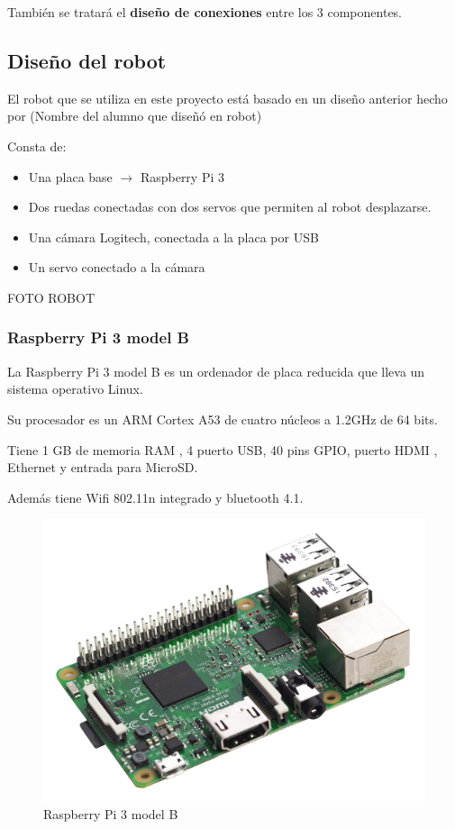\documentclass[twoside, 12pt]{epstfg}
\begin{document}
También se tratará el \textbf{diseño de conexiones} entre los 3 componentes.

\subsection{Diseño del robot}

El robot que se utiliza en este proyecto está basado en un diseño anterior hecho por (Nombre del alumno que diseñó en robot)

Consta de:
\begin{itemize}
	\item Una placa base $\rightarrow$ Raspberry Pi 3
	\item Dos ruedas conectadas con dos servos que permiten al robot desplazarse.
	\item Una cámara Logitech, conectada a la placa por USB
	\item Un servo conectado a la cámara 
\end{itemize}


FOTO ROBOT

\subsubsection{Raspberry Pi 3 model B}

La Raspberry Pi 3 model B es un ordenador de placa reducida que lleva un sistema operativo Linux.

Su procesador es un ARM Cortex A53 de cuatro núcleos a 1.2GHz de 64 bits.

Tiene 1 GB de memoria RAM , 4 puerto USB, 40 pins GPIO, puerto HDMI , Ethernet y entrada para MicroSD.

Además tiene Wifi 802.11n integrado y bluetooth 4.1.


\begin{figure}[h]
	\centerline{
		\mbox{\includegraphics[width=.80\textwidth]{images/raspi3.jpg}}
	}
	\caption{Raspberry Pi 3 model B}
	
\end{figure}
\end{document}
